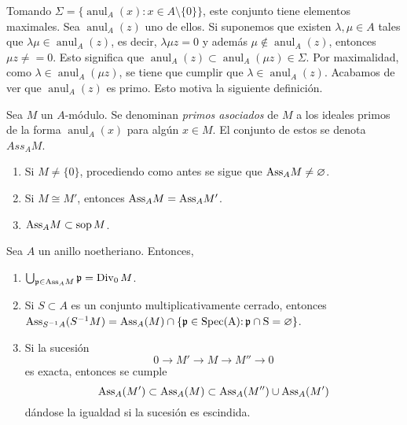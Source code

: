 \documentclass[../main.tex]{subfiles}
\begin{document}
	Tomando $\Sigma=\{\operatorname{anul}_A(x):x\in A\setminus\{0\}\}$, este conjunto tiene elementos maximales. Sea $\operatorname{anul}_A(z)$ uno de ellos. Si suponemos que existen $\lambda,\mu\in A$ tales que $\lambda\mu\in\operatorname{anul}_A(z)$, es decir, $\lambda\mu z=0$ y además $\mu\notin\operatorname{anul}_A(z)$, entonces $\mu z\neq=0$. Esto significa que $\operatorname{anul}_A(z)\subset\operatorname{anul}_A(\mu z)\in\Sigma$. Por maximalidad, como $\lambda\in\operatorname{anul}_A(\mu z)$, se tiene que cumplir que $\lambda\in\operatorname{anul}_A(z)$. Acabamos de ver que $\operatorname{anul}_A(z)$ es primo. Esto motiva la siguiente definición.
	\begin{definition}
		Sea $M$ un $A$-módulo. Se denominan \textit{primos asociados} de $M$ a los ideales primos de la forma $\operatorname{anul}_A(x)$ para algún $x\in M$. El conjunto de estos se denota $Ass_AM$.
	\end{definition}
	\begin{remark}
		\begin{enumerate}
			\item Si $M\neq\{0\}$, procediendo como antes se sigue que $\text{Ass}_AM\neq\varnothing$.
			\item Si $M\cong M'$, entonces $\text{Ass}_AM=\text{Ass}_AM'$.
			\item $\text{Ass}_AM\subset\operatorname{sop}M$.
		\end{enumerate}
	\end{remark}
	\begin{proposition}
		Sea $A$ un anillo noetheriano. Entonces,\begin{enumerate}
			\item $\bigcup_{\mathfrak{p}\in\text{Ass}_AM}\mathfrak{p}=\operatorname{Div}_0M$.
			\item Si $S\subset A$ es un conjunto multiplicativamente cerrado, entonces $\text{Ass}_{S^{-1}A}(S^{-1}M)=\text{Ass}_A(M)\cap\{\mathfrak{p}\in\operatorname{Spec(A):\mathfrak{p}\cap S=\varnothing}\}$.
			\item Si la sucesión $$0\longrightarrow M'\longrightarrow M\longrightarrow M''\longrightarrow 0$$ es exacta, entonces se cumple $$\text{Ass}_A(M')\subset\text{Ass}_A(M)\subset\text{Ass}_A(M'')\cup\text{Ass}_A(M')$$ dándose la igualdad si la sucesión es escindida.
		\end{enumerate}
	\end{proposition}
	
\end{document}

